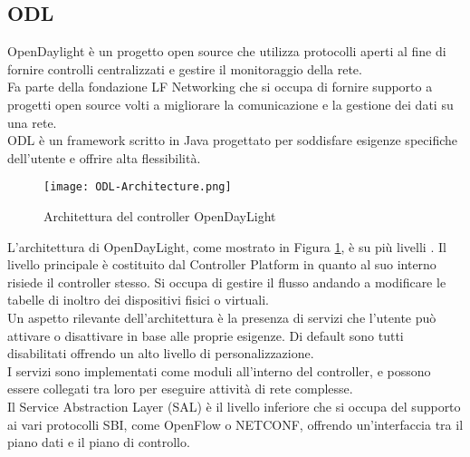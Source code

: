\subsection{ODL}
OpenDaylight\cite{ODL} è un progetto open source che utilizza protocolli aperti al fine di fornire controlli centralizzati e gestire il monitoraggio della rete.
\\Fa parte della fondazione LF Networking \cite{LFN} che si occupa di fornire supporto a progetti open source volti a migliorare la comunicazione e la gestione dei dati su una rete.
\\ODL è un framework scritto in Java progettato per soddisfare esigenze specifiche dell'utente e offrire alta flessibilità. 
\begin{figure}[h]
    \centering
   \texttt{[image: ODL-Architecture.png]}
    \caption{Architettura del controller OpenDayLight \cite{archodl}}
    \label{fig:ArchODL}
\end{figure}
\newline L'architettura di OpenDayLight, come mostrato in Figura \ref{fig:ArchODL}, è su più livelli \cite{tesiodl}. 
Il livello principale è costituito dal Controller Platform in quanto al suo interno risiede il controller stesso. Si 
occupa di gestire il flusso andando a modificare le tabelle di inoltro dei dispositivi fisici o virtuali. 
\\Un aspetto rilevante dell'architettura è la presenza di servizi che l'utente può attivare o disattivare in base alle proprie esigenze.
Di default sono tutti disabilitati offrendo un alto livello di personalizzazione.
\\I servizi sono implementati come moduli all'interno del controller, e possono essere collegati tra loro per eseguire attività di rete complesse. 
\\Il Service Abstraction Layer (SAL) è il livello inferiore che si occupa del supporto ai vari protocolli SBI, come OpenFlow o NETCONF, offrendo un'interfaccia tra il piano dati e il piano di controllo. 
